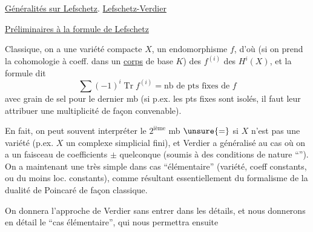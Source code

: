 \uline{Généralités sur Lefschetz}. \uline{Lefschetz-Verdier}

\uline{Préliminaires à la formule de  Lefschetz}

Classique, on a une variété compacte $X$, un endomorphisme $f$, d'où (si on prend la cohomologie à coeff. dans un \uline{corps} de base $K$) des $f^{(i)}$ des $H^i(X)$, et la formule dit
\[
\sum(-1)^i\operatorname{Tr}f^{(i)}=\text{nb de pts fixes de }f
\]
avec grain de sel pour le dernier mb (si p.ex. les pts fixes sont isolés, il faut leur attribuer une multiplicité de façon convenable).

En fait, on peut souvent interpréter le $2^{\text{ième}}$ mb  $\unsure{=}$ si $X$ n'est pas une variété (p.ex. $X$ un complexe simplicial fini), et Verdier a généralisé  au cas où on a un faisceau de coefficients $\pm$ quelconque (soumis à des  conditions de nature ``''). On a maintenant une  très simple dans cas ``élémentaire'' (variété, coeff constants, ou du moins loc. constants), comme résultant  essentiellement du formalisme de la dualité de Poincaré de façon classique.

 On donnera l'approche de Verdier  sans entrer dans les détails, et nous  donnerons en détail le ``cas élémentaire'', qui nous permettra ensuite
